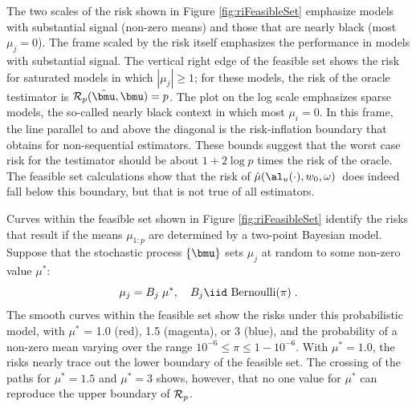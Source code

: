 \documentclass[12pt]{article}
\newcommand{\uTest}{\mbox{$\hat\mu(\al_u(\cdot),w_0,\omega)$}}
\begin{document}
 The two scales of the risk shown in Figure \ref{fig:riFeasibleSet} emphasize
 models with substantial signal (non-zero means) and those that are nearly black
 (most $\mu_j=0$).  The frame scaled by the risk itself emphasizes the
 performance in models with substantial signal.  The vertical right edge of the
 feasible set shows the risk for saturated models in which $|\mu_j| \ge 1$; for
 these models, the risk of the oracle testimator is ${\cal R}_p(\tilde{\bmu},
 \bmu) = p$.  The plot on the log scale emphasizes sparse models, the so-called
 nearly black context in which most $\mu_i = 0$.  In this frame, the line
 parallel to and above the diagonal is the risk-inflation boundary 
 that obtains for non-sequential estimators.  These bounds suggest that the
 worst case risk for the testimator should be about $1 + 2 \log p$ times the
 risk of the oracle.  The feasible set calculations show that the risk of
 \uTest\ does indeed fall below this boundary, but that is not true of all
 estimators.  


 Curves within the feasible set shown in Figure \ref{fig:riFeasibleSet}
 identify the risks that result if the means $\mu_{1:p}$ are determined by a
 two-point Bayesian model.  Suppose that the stochastic process $\{\bmu\}$ sets
 $\mu_j$ at random to some non-zero value $\mu^{*}$:
 \begin{equation}
    \mu_j = B_j \; \mu^{*}, \quad B_j  \iid \mbox{ Bernoulli}(\pi)  \;.
 \label{eq:muj}
 \end{equation}
 The smooth curves within the feasible set show the risks under this
 probabilistic model, with $\mu^{*}$ = 1.0 (red), 1.5 (magenta), or 3 (blue),
 and the probability of a non-zero mean varying over the range $10^{-6} \le \pi
 \le 1-10^{-6}$.  With $\mu^{*} = 1.0$, the risks nearly trace out the lower
 boundary of the feasible set.  The crossing of the paths for $\mu^{*}=1.5$ and
 $\mu^{*}=3$ shows, however, that no one value for $\mu^{*}$ can reproduce the
 upper boundary of ${\cal R}_p$.
\end{document}

